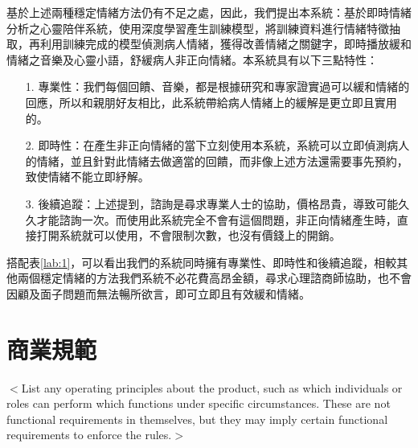 \documentclass[12pt]{scrreprt}
\begin{document}
基於上述兩種穩定情緒方法仍有不足之處，因此，我們提出本系統：基於即時情緒分析之心靈陪伴系統，使用深度學習產生訓練模型，將訓練資料進行情緒特徵抽取，再利用訓練完成的模型偵測病人情緒，獲得改善情緒之關鍵字，即時播放緩和情緒之音樂及心靈小語，舒緩病人非正向情緒。本系統具有以下三點特性：
\begin{itemize}
\item[1.]{專業性：}我們每個回饋、音樂，都是根據研究和專家證實過可以緩和情緒的回應，所以和親朋好友相比，此系統帶給病人情緒上的緩解是更立即且實用的。


\item[2.]{ 即時性：}在產生非正向情緒的當下立刻使用本系統，系統可以立即偵測病人的情緒，並且針對此情緒去做適當的回饋，而非像上述方法還需要事先預約，致使情緒不能立即紓解。


\item[3.] {後續追蹤：}上述提到，諮詢是尋求專業人士的協助，價格昂貴，導致可能久久才能諮詢一次。而使用此系統完全不會有這個問題，非正向情緒產生時，直接打開系統就可以使用，不會限制次數，也沒有價錢上的開銷。
\end{itemize}

搭配表\ref{lab:1}，可以看出我們的系統同時擁有專業性、即時性和後續追蹤，相較其他兩個穩定情緒的方法我們系統不必花費高昂金額，尋求心理諮商師協助，也不會因顧及面子問題而無法暢所欲言，即可立即且有效緩和情緒。\\

\renewcommand{\arraystretch}{1.3} %
\begin{table}[!h]    
\centering
     \caption{各類穩定情緒方法之比較}
\label{lab:1}
\end{table}

\section{商業規範}
$<$List any operating principles about the product, such as which individuals or 
roles can perform which functions under specific circumstances. These are not 
functional requirements in themselves, but they may imply certain functional 
requirements to enforce the rules.$>$
\end{document}
